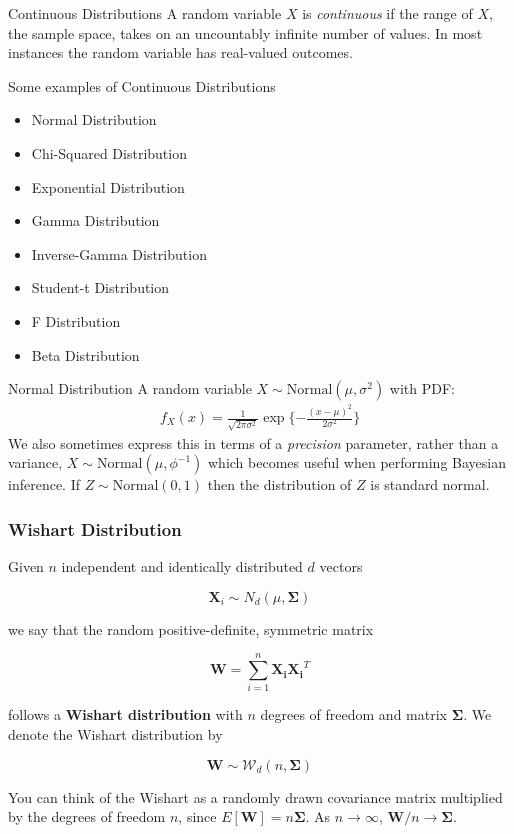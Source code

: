 \documentclass{beamer}
\begin{document}
\begin{frame}{Continuous Distributions}
A random variable $X$ is \emph{continuous} if the range of $X$, the sample space, takes on an uncountably infinite number of values. In most instances the random variable has real-valued outcomes. 
\newline

Some examples of Continuous Distributions
\begin{itemize}
\item{Normal Distribution}
\item{Chi-Squared Distribution}
\item{Exponential Distribution}
\item{Gamma Distribution}
\item{Inverse-Gamma Distribution}
\item{Student-t Distribution}
\item{F Distribution}
\item{Beta Distribution}
\end{itemize}
\end{frame}

\begin{frame}{Normal Distribution}
A random variable $X\sim\mathrm{Normal}(\mu, \sigma^{2})$ with PDF:
\begin{align*}
f_{X}(x) = \frac{1}{\sqrt{2\pi\sigma^{2}}}\exp\{-\frac{(x-\mu)^{2}}{2\sigma^{2}}\}
\end{align*}
We also sometimes express this in terms of a \emph{precision} parameter, rather than a variance, $X\sim\mathrm{Normal}(\mu, \phi^{-1})$ which becomes useful when performing Bayesian inference.  If $Z \sim \mathrm{Normal}(0, 1)$ then the distribution of $Z$ is standard normal.\\
\end{frame}


\begin{frame}
\frametitle{Wishart Distribution}
Given $n$ independent and identically distributed $d$ vectors

$$\mathbf{X}_i \sim N_d(\mu , \mathbf{\Sigma})$$

we say that the random positive-definite, symmetric matrix

$$ \mathbf{W} = \sum_{i = 1}^n \mathbf{X_i} \mathbf{X_i}^T$$

follows a \textbf{Wishart distribution} with $n$ degrees of freedom and matrix $\mathbf{\Sigma}$.  We denote the Wishart distribution by

$$\mathbf{W} \sim \mathcal{W}_d(n, \mathbf{\Sigma})$$

You can think of the Wishart as a randomly drawn covariance matrix multiplied by the degrees of freedom $n$, since $E[\mathbf{W}] = n\mathbf{\Sigma}$.  As $n \rightarrow \infty$, $\mathbf{W}/n \rightarrow \mathbf{\Sigma}$. 
\end{frame}
\end{document}
